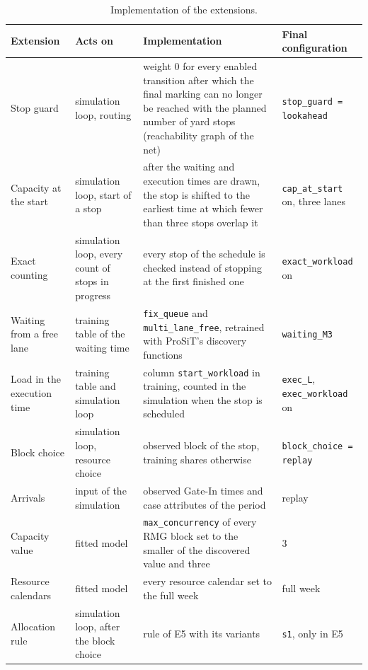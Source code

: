 \begin{table}[htbp]
\centering
\footnotesize
\begin{tabularx}{\textwidth}{L{2.5cm}L{2.5cm}YL{2.7cm}}
\toprule
\textbf{Extension} & \textbf{Acts on} & \textbf{Implementation} & \textbf{Final configuration} \\
\midrule
Stop guard & simulation loop, routing & weight 0 for every enabled transition after which the final marking can no longer be reached with the planned number of yard stops (reachability graph of the net) & \texttt{stop\_guard = lookahead} \\
Capacity at the start & simulation loop, start of a stop & after the waiting and execution times are drawn, the stop is shifted to the earliest time at which fewer than three stops overlap it & \texttt{cap\_at\_start} on, three lanes \\
Exact counting & simulation loop, every count of stops in progress & every stop of the schedule is checked instead of stopping at the first finished one & \texttt{exact\_workload} on \\
Waiting from a free lane & training table of the waiting time & \texttt{fix\_queue} and \texttt{multi\_lane\_free}, retrained with ProSiT's discovery functions & \texttt{waiting\_M3} \\
Load in the execution time & training table and simulation loop & column \texttt{start\_workload} in training, counted in the simulation when the stop is scheduled & \texttt{exec\_L}, \texttt{exec\_workload} on \\
Block choice & simulation loop, resource choice & observed block of the stop, training shares otherwise & \texttt{block\_choice = replay} \\
Arrivals & input of the simulation & observed Gate-In times and case attributes of the period & replay \\
Capacity value & fitted model & \texttt{max\_concurrency} of every RMG block set to the smaller of the discovered value and three & 3 \\
Resource calendars & fitted model & every resource calendar set to the full week & full week \\
Allocation rule & simulation loop, after the block choice & rule of E5 with its variants & \texttt{s1}, only in E5 \\
\bottomrule
\end{tabularx}
\caption{Implementation of the extensions.}
\label{tab:app_patches}
\end{table}

